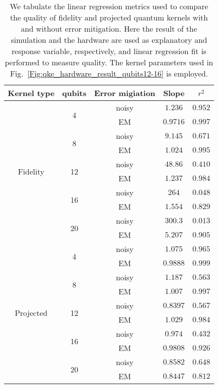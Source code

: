 \documentclass[reprint,amsfonts, amssymb, amsmath,  showkeys, nofootinbib,pra, superscriptaddress, twocolumn,longbibliography]{revtex4-2}
\begin{document}
\begin{table}[htbp]
    \centering
    \begin{tabular}{|c|c|c|c|c|} \hline
        Kernel type & qubits & Error migiation & Slope & $r^2$ \\ \hline
        \multirow{10}{*}{Fidelity} & \multirow{2}{*}{4} & noisy & $1.236$ & $0.952$   \\ \cline{3-5}
        & & EM & $0.9716$ & $0.997$ \\ \cline{2-5}
        & \multirow{2}{*}{8} & noisy & $9.145$ & $0.671$ \\ \cline{3-5}
        & & EM & $1.024$ & $0.995$ \\ \cline{2-5}
        & \multirow{2}{*}{12} & noisy & $48.86$ & $0.410$ \\ \cline{3-5}
        & & EM & $1.237$ & $0.984$ \\ \cline{2-5}
        & \multirow{2}{*}{16} & noisy & $264$ & $0.048$ \\ \cline{3-5}
        & & EM & $1.554$ & $0.829$ \\ \cline{2-5}
        & \multirow{2}{*}{20} & noisy & $300.3$ & $0.013$ \\ \cline{3-5}
        & & EM & $5.207$ & $0.905$ \\ \cline{2-5} \hline
        \multirow{10}{*}{Projected} & \multirow{2}{*}{4} & noisy & $1.075$ & $0.965$  \\ \cline{3-5}
        & & EM & $0.9888$ & $0.999$ \\ \cline{2-5}
        & \multirow{2}{*}{8} & noisy & $1.187$ & $0.563 $ \\ \cline{3-5}
        & & EM & $1.007$ & $0.997$ \\ \cline{2-5}
        & \multirow{2}{*}{12} & noisy & $0.8397$ & $0.567$ \\ \cline{3-5}
        & & EM & $1.029$ & $0.984$ \\ \cline{2-5}
        & \multirow{2}{*}{16} & noisy & $0.974$ & $0.432$ \\ \cline{3-5}
        & & EM & $0.9808$ & $0.926$ \\ \cline{2-5}
        & \multirow{2}{*}{20} & noisy & $0.8582$ & $0.648$ \\ \cline{3-5}
        & & EM & $0.8447$ & $0.812$ \\ \cline{2-5} \hline
    \end{tabular}
    \caption{
    We tabulate the linear regression metrics used to compare the quality of fidelity and projected quantum kernels with and without error mitigation. Here the result of the simulation and the hardware are used as explanatory and response variable, respectively, and linear regression fit is performed to measure quality. The kernel parameters used in  Fig.~\ref{Fig:qke_hardware_result_qubits12-16} is employed.
    }
    \label{tb:fidelity_projected_hardware_results}
\end{table}
\end{document}
